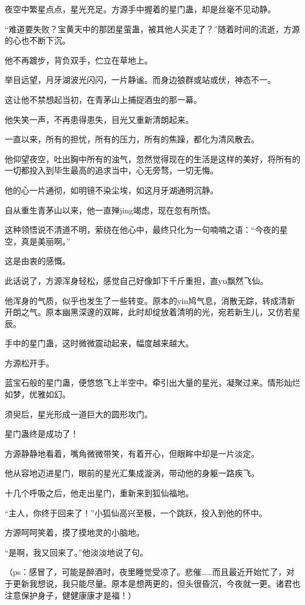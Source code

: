 \begin{this_body}
夜空中繁星点点，星光充足。方源手中握着的星门蛊，却是丝毫不见动静。

“难道要失败？宝黄天中的那团星萤蛊，被其他人买走了？”随着时间的流逝，方源的心也不断下沉。

他不再踱步，背负双手，伫立在草地上。

举目远望，月牙湖波光闪闪，一片静谧。而身边狼群或站或伏，神态不一。

这让他不禁想起当初，在青茅山上捕捉酒虫的那一幕。

他失笑一声，不再患得患失，目光又重新清朗起来。

一直以来，所有的担忧，所有的压力，所有的焦躁，都化为清风散去。

他仰望夜空，吐出胸中所有的浊气，忽然觉得现在的生活是这样的美好，将所有的一切都投入到毕生最高的追求当中，心无旁骛，一切无悔。

他的心一片通彻，如明镜不染尘埃，如这月牙湖通明沉静。

自从重生青茅山以来，他一直殚jing竭虑，现在忽有所悟。

这种领悟说不清道不明，萦绕在他心中，最终只化为一句喃喃之语：“今夜的星空，真是美丽啊。”

这是由衷的感慨。

此话说了，方源浑身轻松，感觉自己好像卸下千斤重担，直yu飘然飞仙。

他浑身的气质，似乎也发生了一些转变。原本的yin鸠气息，消散无踪，转成清新开朗之气。原本幽黑深邃的双眸，此时却绽放着清明的光，宛若新生儿，又仿若星辰。

手中的星门蛊，这时微微震动起来，幅度越来越大。

方源松开手。

蓝宝石般的星门蛊，便悠悠飞上半空中。牵引出大量的星光，凝聚过来。情形灿烂如梦，优雅如幻。

须臾后，星光形成一道巨大的圆形攻门。

星门蛊终是成功了！

方源静静地看着，嘴角微微带笑，有着开心，但眼眸中却是一片淡定。

他从容地迈进星门，眼前的星光汇集成漩涡，带动他的身躯一路疾飞。

十几个呼吸之后，他走出星门，重新来到狐仙福地。

“主人，你终于回来了！”小狐仙高兴至极，一个跳跃，投入到他的怀中。

方源呵呵笑着，摸了摸地灵的小脑地。

“是啊，我又回来了。”他淡淡地说了句。

（ps：感冒了，可能是醉酒时，夜里睡觉受凉了。悲催……而且最近开始忙了，对于更新我想说，我只能尽量。原本是想两更的，但头很昏沉，今夜就一更。诸君也注意保护身子，健健康康才是福！）

\end{this_body}

